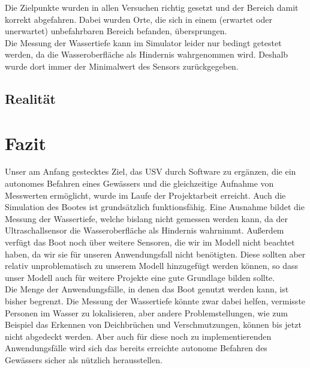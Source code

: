 \documentclass[11pt]{article}
\begin{document}
Die Zielpunkte wurden in allen Versuchen richtig gesetzt und der Bereich damit korrekt abgefahren. Dabei wurden Orte, die sich in einem (erwartet oder unerwartet) unbefahrbaren Bereich befanden, übersprungen.\\
Die Messung der Wassertiefe kann im Simulator leider nur bedingt getestet werden, da die Wasseroberfläche als Hindernis wahrgenommen wird. Deshalb wurde dort immer der Minimalwert des Sensors zurückgegeben.

\subsection{Realität}


\section{Fazit} \label{fazit}
Unser am Anfang gestecktes Ziel, das USV durch Software zu ergänzen, die ein autonomes Befahren eines Gewässers und die gleichzeitige Aufnahme von Messwerten ermöglicht, wurde im Laufe der Projektarbeit erreicht. Auch die Simulation des Bootes ist grundsätzlich funktionsfähig. Eine Ausnahme bildet die Messung der Wassertiefe, welche bislang nicht gemessen werden kann, da der Ultraschallsensor die Wasseroberfläche als Hindernis wahrnimmt. Außerdem verfügt das Boot noch über weitere Sensoren, die wir im Modell nicht beachtet haben, da wir sie für unseren Anwendungsfall nicht benötigten. Diese sollten aber relativ unproblematisch zu unserem Modell hinzugefügt werden können, so dass unser Modell auch für weitere Projekte eine gute Grundlage bilden sollte.\\
Die Menge der Anwendungsfälle, in denen das Boot genutzt werden kann, ist bisher begrenzt. Die Messung der Wassertiefe könnte zwar dabei helfen, vermisste Personen im Wasser zu lokalisieren, aber andere Problemstellungen, wie zum Beispiel das Erkennen von Deichbrüchen und Verschmutzungen, können bis jetzt nicht abgedeckt werden. Aber auch für diese noch zu implementierenden Anwendungsfälle wird sich das bereits erreichte autonome Befahren des Gewässers sicher als nützlich herausstellen.

{}

\end{document}
